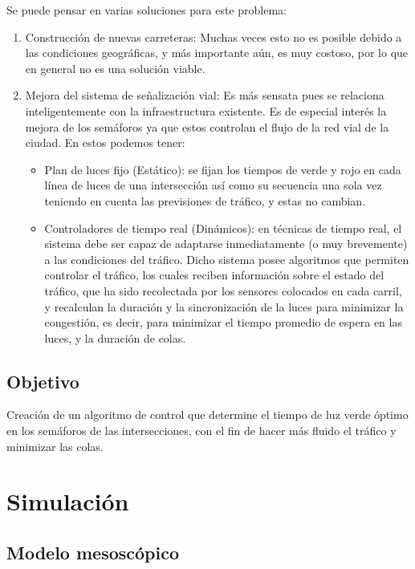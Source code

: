 \documentclass[colorinlistoftodos,twoside,twocolumn]{article} %
\begin{document}
	\vspace{0.5em}
	Se puede pensar en varias soluciones para este problema:
	\begin{enumerate}
		\item Construcción de nuevas carreteras: Muchas veces esto no es posible debido a las condiciones geográficas, y más importante aún, es muy costoso, por lo que en general no es una solución viable.
		\item Mejora del sistema de señalización vial: Es más sensata pues se relaciona inteligentemente con la infraestructura existente. Es de especial interés la mejora de los semáforos ya que estos controlan el flujo de la red vial de la ciudad. En estos podemos tener:
		\begin{itemize}
			\item Plan de luces fijo (Estático): se fijan los tiempos de verde y rojo en cada línea de luces de una intersección así como su secuencia una sola vez teniendo en cuenta las previsiones de tráfico, y estas no cambian.
			\item Controladores de tiempo real (Dinámicos): en técnicas de tiempo real, el sistema debe ser capaz de adaptarse inmediatamente (o muy brevemente) a las condiciones del tráfico. Dicho sistema posee algoritmos que permiten controlar el tráfico, los cuales reciben información sobre el estado del tráfico, que ha sido recolectada por los sensores colocados en cada carril, y recalculan la duración y la sincronización de la luces para minimizar la congestión, es decir, para minimizar el tiempo promedio de espera en las luces, y la duración de colas.
		\end{itemize} 
	\end{enumerate}

	\subsection{Objetivo}
	
	Creación de un algoritmo de control que determine el tiempo de luz verde óptimo en los semáforos de las intersecciones, con el fin de hacer más fluido el tráfico y minimizar las colas.
	
	\section{Simulación}
	
	\subsection{Modelo mesosc\'opico}
	
\end{document}
